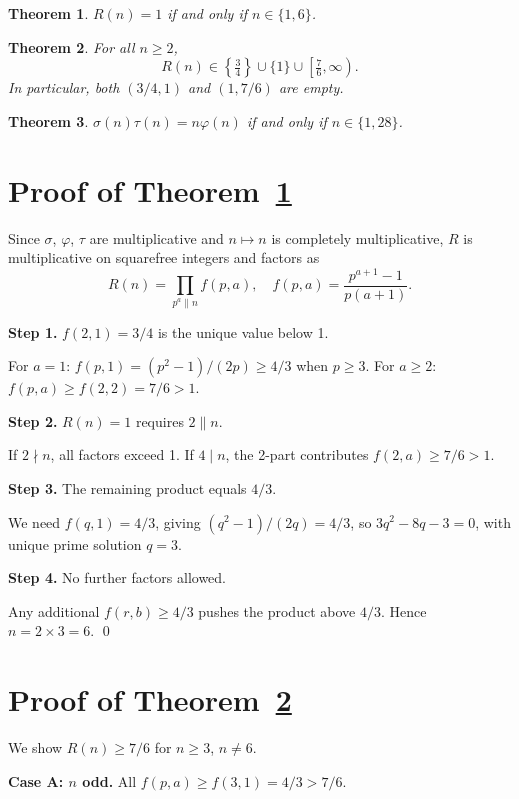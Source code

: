\documentclass[11pt]{amsart}
\newtheorem{theorem}{Theorem}
\theoremstyle{remark}
\begin{document}
\begin{theorem}\label{thm:main}
$R(n) = 1$ if and only if $n \in \{1, 6\}$.
\end{theorem}

\begin{theorem}\label{thm:gap}
For all $n \geq 2$,
\[
  R(n) \in \left\{\tfrac{3}{4}\right\} \cup \{1\} \cup \left[\tfrac{7}{6}, \infty\right).
\]
In particular, both $(3/4, 1)$ and $(1, 7/6)$ are empty.
\end{theorem}

\begin{theorem}\label{thm:dual}
$\sigma(n)\tau(n) = n\varphi(n)$ if and only if $n \in \{1, 28\}$.
\end{theorem}

\section{Proof of Theorem~\ref{thm:main}}

Since $\sigma$, $\varphi$, $\tau$ are multiplicative and $n \mapsto n$ is
completely multiplicative, $R$ is multiplicative on squarefree integers and
factors as
\[
  R(n) = \prod_{p^a \| n} f(p,a), \quad
  f(p,a) = \frac{p^{a+1}-1}{p(a+1)}.
\]

\textbf{Step 1.} $f(2,1) = 3/4$ is the unique value below 1.

For $a=1$: $f(p,1) = (p^2-1)/(2p) \geq 4/3$ when $p \geq 3$.
For $a \geq 2$: $f(p,a) \geq f(2,2) = 7/6 > 1$.

\textbf{Step 2.} $R(n)=1$ requires $2 \| n$.

If $2 \nmid n$, all factors exceed 1. If $4 \mid n$, the 2-part contributes
$f(2,a) \geq 7/6 > 1$.

\textbf{Step 3.} The remaining product equals $4/3$.

We need $f(q,1) = 4/3$, giving $(q^2-1)/(2q) = 4/3$, so $3q^2 - 8q - 3 = 0$,
with unique prime solution $q = 3$.

\textbf{Step 4.} No further factors allowed.

Any additional $f(r,b) \geq 4/3$ pushes the product above $4/3$.
Hence $n = 2 \times 3 = 6$.  \qed

\section{Proof of Theorem~\ref{thm:gap}}

We show $R(n) \geq 7/6$ for $n \geq 3$, $n \neq 6$.

\textbf{Case A: $n$ odd.} All $f(p,a) \geq f(3,1) = 4/3 > 7/6$.
\end{document}
